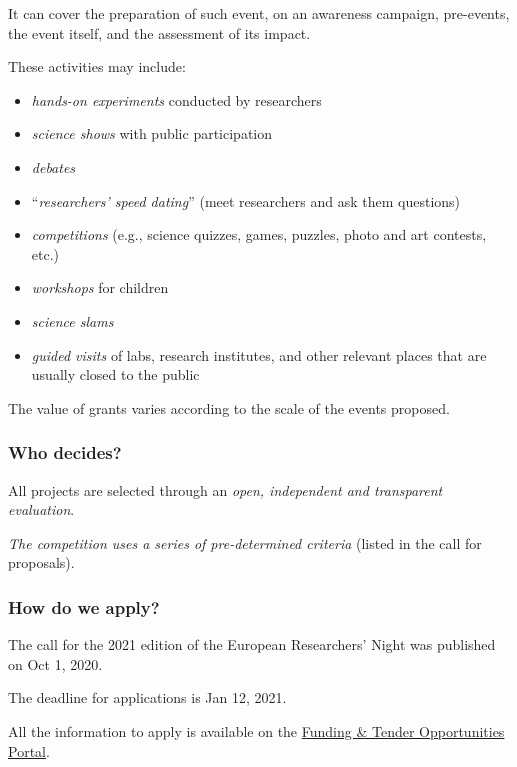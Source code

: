 \documentclass[oneside]{book}
\numberwithin{equation}{section}
\begin{document}
It can cover the preparation of such event, on an awareness campaign, pre-events, the event itself, and the assessment of its impact.

These activities may include:
\begin{itemize}
    \item \textit{hands-on experiments} conducted by researchers
    \item \textit{science shows} with public participation
    \item \textit{debates}
    \item ``\textit{researchers' speed dating}'' (meet researchers and ask them questions)
    \item \textit{competitions} (e.g., science quizzes, games, puzzles, photo and art contests, etc.)
    \item \textit{workshops} for children
    \item \textit{science slams}
    \item \textit{guided visits} of labs, research institutes, and other relevant places that are usually closed to the public
\end{itemize}
The value of grants varies according to the scale of the events proposed.

\subsubsection{Who decides?}
All projects are selected through an \textit{open, independent and transparent evaluation}.

\textit{The competition uses a series of pre-determined criteria} (listed in the call for proposals).

\subsubsection{How do we apply?}
The call for the 2021 edition of the European Researchers' Night was published on Oct 1, 2020.

The deadline for applications is Jan 12, 2021.

All the information to apply is available on the \href{https://ec.europa.eu/info/funding-tenders/opportunities/portal/screen/opportunities/topic-details/msca-night-2020bis;freeTextSearchKeyword=;typeCodes=0,1;statusCodes=31094501,31094502,31094503;programCode=null;programDivisionCode=null;focusAreaCode=null;crossCuttingPriorityCode=null;callCode=Default;sortQuery=submissionStatus;orderBy=asc;onlyTenders=false;topicListKey=topicSearchTablePageState}{Funding \& Tender Opportunities Portal}.
\end{document}

